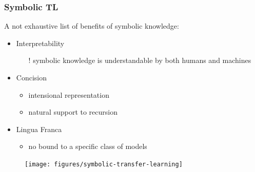 \documentclass[presentation]{beamer}\mode<presentation>{\usetheme{blackAMSBolognaFC}}
\begin{document}
\begin{frame}[allowframebreaks]
\frametitle{Symbolic TL}

    A not exhaustive list of benefits of \alert{symbolic} knowledge:~
    \vspace{0.5cm}
    \begin{itemize}
        \item Interpretability
        \begin{itemize}
            \item[!] symbolic knowledge is understandable by both humans and machines
        \end{itemize}

        \vfill

        \item Concision
        \begin{itemize}
            \item intensional representation
            \item natural support to recursion
        \end{itemize}

        \vfill

        \item Lingua Franca
        \begin{itemize}
            \item no bound to a specific class of models
        \end{itemize}

        \vfill

    \end{itemize}

    \framebreak

    \centering
    \begin{figure}
        \texttt{[image: figures/symbolic-transfer-learning]}
    \end{figure}

\end{frame}
\end{document}
